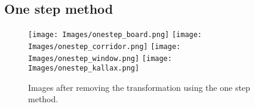 \documentclass{article}
\begin{document}
\subsection{One step method}
\begin{figure}[H]
    \centering
    \texttt{[image: Images/onestep\_board.png]}
    \texttt{[image: Images/onestep\_corridor.png]}
    \texttt{[image: Images/onestep\_window.png]}
    \texttt{[image: Images/onestep\_kallax.png]}
    \caption{Images after removing the transformation using the one step method.}
    \label{fig:enter-label}
\end{figure}
\end{document}
